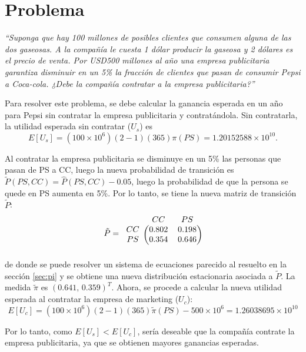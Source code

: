 \section{Problema}
{\it ``Suponga que hay 100 millones de posibles clientes que consumen alguna de las dos gaseosas. A la compañía le cuesta 1 dólar producir la gaseosa y 2 dólares es el precio de venta. Por USD500 millones al año una empresa publicitaria garantiza disminuir en un 5\% la fracción de clientes que pasan de consumir Pepsi a Coca-cola. ¿Debe la compañía contratar a la empresa publicitaria?''}

Para resolver este problema, se debe calcular la ganancia esperada en un año para Pepsi sin contratar la empresa publicitaria y contratándola. Sin contratarla, la utilidad esperada sin contratar ($U_s$) es
\[
E[U_s] = (100\times10^6)(2-1)(365)\pi(PS)=1.20152588\times10^{10}.
\]

Al contratar la empresa publicitaria se disminuye en un 5\% las personas que pasan de PS a CC, luego la nueva probabilidad de transición es $\tilde{P}(PS,CC)=\hat{P}(PS,CC) - 0.05$, luego la probabilidad de que la persona se quede en PS aumenta en 5\%. Por lo tanto, se tiene la nueva matriz de transición $\tilde{P}$:
\[
\tilde{P}=\begin{blockarray}{ccc}
& CC & PS \\
\begin{block}{c(cc)}
  CC & 0.802 & 0.198 \\
  PS & 0.354 & 0.646 \\
\end{block}
\end{blockarray}
\]
de donde se puede resolver un sistema de ecuaciones parecido al resuelto en la sección \ref{sec:pi} y se obtiene una nueva distribución estacionaria asociada a $\tilde{P}$. La medida $\tilde{\pi}$ es $(0.641,\,0.359)^T$. Ahora, se procede a calcular la nueva utilidad esperada al contratar la empresa de marketing ($U_c$):
\[
E[U_c]=(100\times10^6)(2-1)(365)\tilde{\pi}(PS) - 500\times10^6 = 1.26038695\times10^{10}
\]

Por lo tanto, como $E[U_s]<E[U_c]$, sería deseable que la compañía contrate la empresa publicitaria, ya que se obtienen mayores ganancias esperadas.

